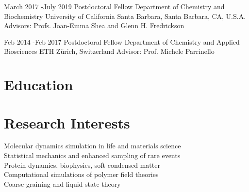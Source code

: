 \documentclass[10pt]{article} %
\begin{document}

\jobb
{March 2017 -}{July 2019}
{Postdoctoral Fellow}
{Department of Chemistry and Biochemistry }
{University of California Santa Barbara, Santa Barbara, CA, U.S.A.}
{Advisors: Profs. Joan-Emma Shea and Glenn H. Fredrickson} 

\jobb
{Feb 2014 -}{Feb 2017}
{Postdoctoral Fellow}
{Department of Chemistry and Applied Biosciences}
{ETH Z{\"u}rich, Switzerland}
{Advisor: Prof. Michele Parrinello} 


\section{Education}


\section{Research Interests}

Molecular dynamics simulation in life and materials science \\
Statistical mechanics and enhanced sampling of rare events \\
Protein dynamics, biophysics, soft condensed matter \\
Computational simulations of polymer field theories \\
Coarse-graining and liquid state theory\\
\end{document}

